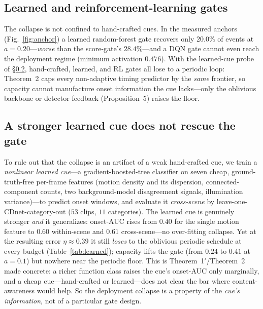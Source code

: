 ﻿\documentclass[lettersize,journal]{IEEEtran}
\begin{document}
\subsection{Learned and reinforcement-learning gates}
The collapse is not confined to hand-crafted cues. In the measured anchors (Fig.~\ref{fig:anchor}) a learned random-forest gate recovers only $20.0\%$ of events at $a{=}0.20$---\emph{worse} than the score-gate's $28.4\%$---and a DQN gate cannot even reach the deployment regime (minimum activation $0.476$). With the learned-cue probe of \S\ref{sec:learnedcue}, hand-crafted, learned, and RL gates all lose to a periodic loop: Theorem~2 caps every non-adaptive timing predictor by the \emph{same} frontier, so capacity cannot manufacture onset information the cue lacks---only the oblivious backbone or detector feedback (Proposition~5) raises the floor.

\subsection{A stronger learned cue does not rescue the gate}\label{sec:learnedcue}
To rule out that the collapse is an artifact of a weak hand-crafted cue, we train a \emph{nonlinear learned cue}---a gradient-boosted-tree classifier on seven cheap, ground-truth-free per-frame features (motion density and its dispersion, connected-component counts, two background-model disagreement signals, illumination variance)---to predict onset windows, and evaluate it \emph{cross-scene} by leave-one-CDnet-category-out ($53$ clips, $11$ categories). The learned cue is genuinely stronger \emph{and} it generalizes: onset-AUC rises from $0.40$ for the single motion feature to $0.60$ within-scene and $0.61$ cross-scene---no over-fitting collapse. Yet at the resulting error $\eta\approx0.39$ it still \emph{loses} to the oblivious periodic schedule at every budget (Table~\ref{tab:learned}); capacity lifts the gate (from $0.24$ to $0.41$ at $a{=}0.1$) but nowhere near the periodic floor. This is Theorem~1$'$/Theorem~2 made concrete: a richer function class raises the cue's onset-AUC only marginally, and a cheap cue---hand-crafted or learned---does not clear the bar where content-awareness would help. So the deployment collapse is a property of the \emph{cue's information}, not of a particular gate design.
\end{document}
